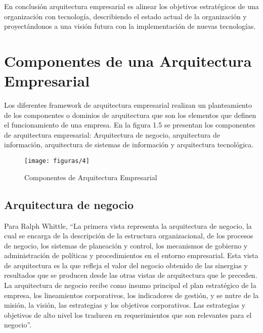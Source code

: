   En conclusión arquitectura empresarial es alinear los objetivos estratégicos de una organización con tecnología, describiendo el estado actual de la organización y proyectándonos a una visión futura con la implementación de nuevas tecnologías.
  
\section{Componentes de una Arquitectura Empresarial}
Los diferentes framework de arquitectura empresarial realizan un planteamiento de los componentes o dominios de arquitectura que son los elementos que definen el funcionamiento de una empresa. En la figura 1.5 se presentan los componentes de arquitectura empresarial: Arquitectura de negocio, arquitectura de información, arquitectura de sistemas de información y arquitectura tecnológica.
  
  \begin{figure}[H]
  	\centering
  	\texttt{[image: figuras/4]}
   	\captionsetup{width=.95\textwidth}
   	\caption{Componentes de Arquitectura Empresarial}
   	\label{figura4}
  \end{figure}
  
  \subsection{Arquitectura de negocio}
  Para Ralph Whittle, “La primera vista representa la arquitectura de negocio, la cual se encarga de la descripción de la estructura organizacional, de los procesos de negocio, los sistemas de planeación y control, los mecanismos de gobierno y administración de políticas y procedimientos en el entorno empresarial. Esta vista de arquitectura es la que refleja el valor del negocio obtenido de las sinergias y resultados que se producen desde las otras vistas de arquitectura que le preceden. La arquitectura de negocio recibe como insumo principal el plan estratégico de la empresa, los lineamientos corporativos, los indicadores de gestión, y se nutre de la misión, la visión, las estrategias y los objetivos corporativos. Las estrategias y objetivos de alto nivel los traducen en requerimientos que son relevantes para el negocio”.
